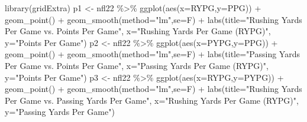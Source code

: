 \documentclass[
  11pt,
]{book}
\newenvironment{Shaded}{\begin{snugshade}}{\end{snugshade}}
\newcommand{\AttributeTok}[1]{\textcolor[rgb]{0.77,0.63,0.00}{#1}}
\newcommand{\FunctionTok}[1]{\textcolor[rgb]{0.00,0.00,0.00}{#1}}
\newcommand{\NormalTok}[1]{#1}
\newcommand{\OtherTok}[1]{\textcolor[rgb]{0.56,0.35,0.01}{#1}}
\newcommand{\SpecialCharTok}[1]{\textcolor[rgb]{0.00,0.00,0.00}{#1}}
\newcommand{\StringTok}[1]{\textcolor[rgb]{0.31,0.60,0.02}{#1}}
\theoremstyle{definition}
\theoremstyle{definition}
\theoremstyle{definition}
\theoremstyle{definition}
\theoremstyle{remark}
\begin{document}
\begin{Shaded}
\begin{Highlighting}[]
\FunctionTok{library}\NormalTok{(gridExtra)}
\NormalTok{p1 }\OtherTok{\textless{}{-}}\NormalTok{ nfl22 }\SpecialCharTok{\%\textgreater{}\%} \FunctionTok{ggplot}\NormalTok{(}\FunctionTok{aes}\NormalTok{(}\AttributeTok{x=}\NormalTok{RYPG,}\AttributeTok{y=}\NormalTok{PPG)) }\SpecialCharTok{+} 
  \FunctionTok{geom\_point}\NormalTok{() }\SpecialCharTok{+}
  \FunctionTok{geom\_smooth}\NormalTok{(}\AttributeTok{method=}\StringTok{"lm"}\NormalTok{,}\AttributeTok{se=}\NormalTok{F) }\SpecialCharTok{+}
  \FunctionTok{labs}\NormalTok{(}\AttributeTok{title=}\StringTok{"Rushing Yards Per Game vs. Points Per Game"}\NormalTok{,}
       \AttributeTok{x=}\StringTok{"Rushing Yards Per Game (RYPG)"}\NormalTok{,}
       \AttributeTok{y=}\StringTok{"Points Per Game"}\NormalTok{)}
\NormalTok{p2 }\OtherTok{\textless{}{-}}\NormalTok{ nfl22 }\SpecialCharTok{\%\textgreater{}\%} \FunctionTok{ggplot}\NormalTok{(}\FunctionTok{aes}\NormalTok{(}\AttributeTok{x=}\NormalTok{PYPG,}\AttributeTok{y=}\NormalTok{PPG)) }\SpecialCharTok{+} 
  \FunctionTok{geom\_point}\NormalTok{() }\SpecialCharTok{+}
  \FunctionTok{geom\_smooth}\NormalTok{(}\AttributeTok{method=}\StringTok{"lm"}\NormalTok{,}\AttributeTok{se=}\NormalTok{F) }\SpecialCharTok{+}
  \FunctionTok{labs}\NormalTok{(}\AttributeTok{title=}\StringTok{"Passing Yards Per Game vs. Points Per Game"}\NormalTok{,}
       \AttributeTok{x=}\StringTok{"Passing Yards Per Game (RYPG)"}\NormalTok{,}
       \AttributeTok{y=}\StringTok{"Points Per Game"}\NormalTok{)}
\NormalTok{p3 }\OtherTok{\textless{}{-}}\NormalTok{ nfl22 }\SpecialCharTok{\%\textgreater{}\%} \FunctionTok{ggplot}\NormalTok{(}\FunctionTok{aes}\NormalTok{(}\AttributeTok{x=}\NormalTok{RYPG,}\AttributeTok{y=}\NormalTok{PYPG)) }\SpecialCharTok{+} 
  \FunctionTok{geom\_point}\NormalTok{() }\SpecialCharTok{+}
  \FunctionTok{geom\_smooth}\NormalTok{(}\AttributeTok{method=}\StringTok{"lm"}\NormalTok{,}\AttributeTok{se=}\NormalTok{F) }\SpecialCharTok{+}
  \FunctionTok{labs}\NormalTok{(}\AttributeTok{title=}\StringTok{"Rushing Yards Per Game vs. Passing Yards Per Game"}\NormalTok{,}
       \AttributeTok{x=}\StringTok{"Rushing Yards Per Game (RYPG)"}\NormalTok{,}
       \AttributeTok{y=}\StringTok{"Passing Yards Per Game"}\NormalTok{)}
\end{Highlighting}
\end{Shaded}

\vfill

\newpage
\end{document}
